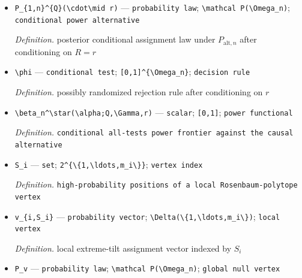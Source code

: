 \documentclass{article}
\begin{document}
\begin{itemize}
  \item \texttt{P\_\allowbreak{}\{1,\allowbreak{}n\}\allowbreak{}\textasciicircum{}\{Q\}\allowbreak{}(\textbackslash{}\allowbreak{}cdot\textbackslash{}\allowbreak{}mid r)} --- \texttt{probability law}; \texttt{\textbackslash{}\allowbreak{}mathcal P(\textbackslash{}\allowbreak{}Omega\_\allowbreak{}n)}; \texttt{conditional power alternative}
  \par\smallskip\noindent\emph{Definition.} posterior conditional assignment law under \(P_{\mathrm{alt},n}\) after conditioning on \(R=r\)
  \item \texttt{\textbackslash{}\allowbreak{}phi} --- \texttt{conditional test}; \texttt{[0,\allowbreak{}1]\textasciicircum{}\{\textbackslash{}\allowbreak{}Omega\_\allowbreak{}n\}\allowbreak{}}; \texttt{decision rule}
  \par\smallskip\noindent\emph{Definition.} possibly randomized rejection rule after conditioning on \(r\)
  \item \texttt{\textbackslash{}\allowbreak{}beta\_\allowbreak{}n\textasciicircum{}\textbackslash{}\allowbreak{}star(\textbackslash{}\allowbreak{}alpha;\allowbreak{}Q,\allowbreak{}\textbackslash{}\allowbreak{}Gamma,\allowbreak{}r)} --- \texttt{scalar}; \texttt{[0,\allowbreak{}1]}; \texttt{power functional}
  \par\smallskip\noindent\emph{Definition.} \texttt{conditional all-\allowbreak{}tests power frontier against the causal alternative}
  \item \texttt{S\_\allowbreak{}i} --- \texttt{set}; \texttt{2\textasciicircum{}\{\textbackslash{}\allowbreak{}\{1,\allowbreak{}\textbackslash{}\allowbreak{}ldots,\allowbreak{}m\_\allowbreak{}i\textbackslash{}\allowbreak{}\}\allowbreak{}\}\allowbreak{}}; \texttt{vertex index}
  \par\smallskip\noindent\emph{Definition.} \texttt{high-\allowbreak{}probability positions of a local Rosenbaum-\allowbreak{}polytope vertex}
  \item \texttt{v\_\allowbreak{}\{i,\allowbreak{}S\_\allowbreak{}i\}\allowbreak{}} --- \texttt{probability vector}; \texttt{\textbackslash{}\allowbreak{}Delta(\textbackslash{}\allowbreak{}\{1,\allowbreak{}\textbackslash{}\allowbreak{}ldots,\allowbreak{}m\_\allowbreak{}i\textbackslash{}\allowbreak{}\}\allowbreak{})}; \texttt{local vertex}
  \par\smallskip\noindent\emph{Definition.} local extreme-tilt assignment vector indexed by \(S_i\)
  \item \texttt{P\_\allowbreak{}v} --- \texttt{probability law}; \texttt{\textbackslash{}\allowbreak{}mathcal P(\textbackslash{}\allowbreak{}Omega\_\allowbreak{}n)}; \texttt{global null vertex}

\end{itemize}
\end{document}
